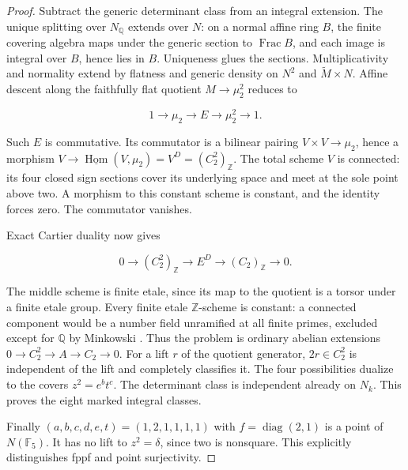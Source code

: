 \begin{proof}
Subtract the generic determinant class from an integral
extension. The unique splitting over $N_{\mathbb Q}$
extends over $N$: on a normal affine ring $B$, the finite
covering algebra maps under the generic section to
$\operatorname{Frac}B$, and each image is integral over
$B$, hence lies in $B$. Uniqueness glues the sections.
Multiplicativity and normality extend by flatness and
generic density on $N^2$ and $\widetilde M\times N$.
Affine descent along the faithfully flat quotient
$M\to\mu_2^2$ reduces to

$$
1\to\mu_2\to E\to\mu_2^2\to1.
$$


Such $E$ is commutative. Its commutator is a bilinear
pairing $V\times V\to\mu_2$, hence a morphism
$V\to\underline{\operatorname{Hom}}(V,\mu_2)=V^D
=(C_2^2)_{\mathbb Z}$.
The total scheme $V$ is connected: its four closed
sign sections cover its underlying space and meet at
the sole point above two. A morphism to this constant
scheme is constant, and the identity forces zero.
The commutator vanishes.

Exact Cartier duality
\cite[Sections 3.2.2--3.2.3 and Proposition 29]{D_Stix}
now gives

$$
0\to(C_2^2)_{\mathbb Z}\to E^D\to(C_2)_{\mathbb Z}\to0.
$$

The middle scheme is finite etale, since its map to the
quotient is a torsor under a finite etale group.
Every finite etale $\mathbb Z$-scheme is constant:
a connected component would be a number field unramified
at all finite primes, excluded except for $\mathbb Q$
by Minkowski \cite[Theorem 4.9]{D_MilneANT}.
Thus the problem is ordinary abelian extensions
$0\to C_2^2\to A\to C_2\to0$.
For a lift $r$ of the quotient generator, $2r\in C_2^2$
is independent of the lift and completely classifies it.
The four possibilities dualize to the covers $z^2=e^bt^c$.
The determinant class is independent already on $N_k$.
This proves the eight marked integral classes.

Finally $(a,b,c,d,e,t)=(1,2,1,1,1,1)$ with
$f=\operatorname{diag}(2,1)$ is a point of $N(\mathbb F_5)$.
It has no lift to $z^2=\delta$, since two is nonsquare.
This explicitly distinguishes fppf and point surjectivity.
\end{proof}

